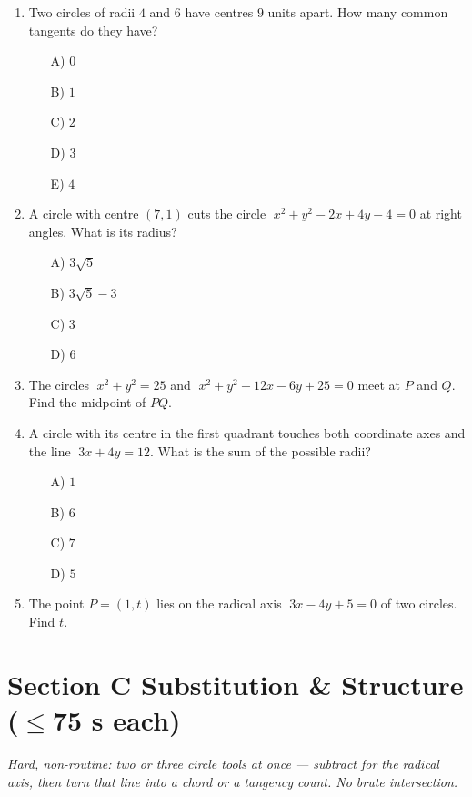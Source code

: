 \documentclass[11pt,a4paper]{article}
\begin{document}
\begin{enumerate}
\item Two circles of radii $4$ and $6$ have centres $9$ units apart. How many common tangents do they have?
\begin{itemize}
\item[A)] $0$
\item[B)] $1$
\item[C)] $2$
\item[D)] $3$
\item[E)] $4$
\end{itemize}

\item A circle with centre $(7,1)$ cuts the circle $\;x^2+y^2-2x+4y-4=0$ at right angles. What is its radius?
\begin{itemize}
\item[A)] $3\sqrt5$
\item[B)] $3\sqrt5-3$
\item[C)] $3$
\item[D)] $6$
\end{itemize}

\item The circles $\;x^2+y^2=25$ and $\;x^2+y^2-12x-6y+25=0$ meet at $P$ and $Q$. Find the midpoint of $PQ$.

\item A circle with its centre in the first quadrant touches both coordinate axes and the line $\;3x+4y=12$. What is the sum of the possible radii?
\begin{itemize}
\item[A)] $1$
\item[B)] $6$
\item[C)] $7$
\item[D)] $5$
\end{itemize}

\item The point $P=(1,t)$ lies on the radical axis $\;3x-4y+5=0$ of two circles. Find $t$.

\end{enumerate}

\section*{Section C \quad Substitution \& Structure \hfill{\normalfont\small($\leq$75 s each)}}

\noindent\textit{Hard, non-routine: two or three circle tools at once --- subtract for the radical axis, then turn that line into a chord or a tangency count. No brute intersection.}
\end{document}

